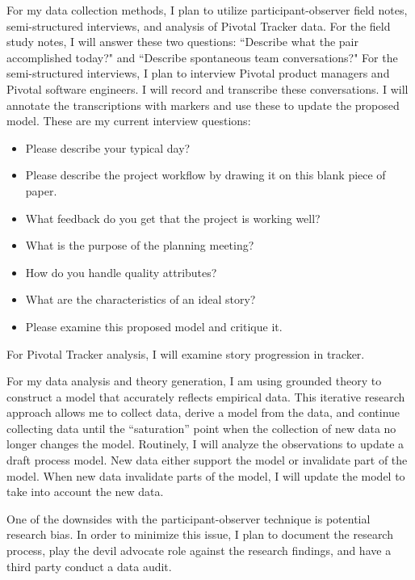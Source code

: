 \documentclass[preprint,12pt,3p]{elsarticle}
\begin{document}
For my data collection methods, I plan to utilize participant-observer field notes, semi-structured interviews, and analysis of Pivotal Tracker data. For the field study notes, I will answer these two questions: ``Describe what the pair accomplished today?" and ``Describe spontaneous team conversations?" For the semi-structured interviews, I plan to interview Pivotal product managers and Pivotal software engineers. I will record and transcribe these conversations. I will annotate the transcriptions with markers and use these to update the proposed model. These are my current interview questions:
\begin{itemize}
\item{Please describe your typical day?}
\item{Please describe the project workflow by drawing it on this blank piece of paper.}
\item{What feedback do you get that the project is working well?}
\item{What is the purpose of the planning meeting?}
\item{How do you handle quality attributes?}
\item{What are the characteristics of an ideal story?}
\item{Please examine this proposed model and critique it.}
\end{itemize}
For Pivotal Tracker analysis, I will examine story progression in tracker.

For my data analysis and theory generation, I am using grounded theory \cite{ConstructivistGroundedTheory} to construct a model that accurately reflects empirical data. This iterative research approach allows me to collect data, derive a model from the data, and continue collecting data until the ``saturation'' point when the collection of new data no longer changes the model. Routinely, I will analyze the observations to update a draft process model. New data either support the model or invalidate part of the model. When new data invalidate parts of the model, I will update the model to take into account the new data.


One of the downsides with the participant-observer technique is potential research bias. In order to minimize this issue, I plan to document the research process, play the devil advocate role against the research findings, and have a third party conduct a data audit.
\end{document}
